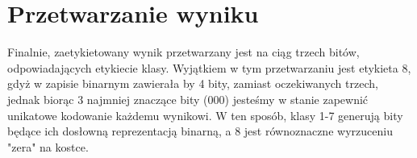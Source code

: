 \section{Przetwarzanie wyniku}

Finalnie, zaetykietowany wynik przetwarzany jest na ciąg trzech bitów, odpowiadających etykiecie klasy.
Wyjątkiem w tym przetwarzaniu jest etykieta 8, gdyż w zapisie binarnym zawierała by 4 bity, zamiast oczekiwanych trzech, jednak biorąc 3 najmniej znaczące bity (000) jesteśmy w stanie zapewnić unikatowe kodowanie każdemu wynikowi.
W ten sposób, klasy 1-7 generują bity będące ich dosłowną reprezentacją binarną, a 8 jest równoznaczne wyrzuceniu "zera" na kostce.




